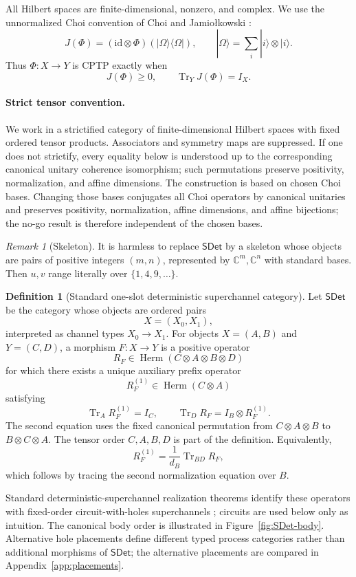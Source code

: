 \documentclass[11pt,a4paper]{article}
\theoremstyle{definition}
\newtheorem{definition}{Definition}[section]
\theoremstyle{plain}
\theoremstyle{remark}
\newtheorem{remark}[theorem]{Remark}
\DeclareMathOperator{\Tr}{Tr}
\DeclareMathOperator{\Herm}{Herm}
\newcommand{\id}{\mathrm{id}}
\newcommand{\SDet}{\mathsf{SDet}}
\begin{document}
All Hilbert spaces are finite-dimensional, nonzero, and complex. We use the
unnormalized Choi convention of Choi and Jamio\l{}kowski
\cite{choi1975,jamiolkowski1972}:
\[
J(\Phi)=(\id\otimes\Phi)(|\Omega\rangle\langle\Omega|),
\qquad |\Omega\rangle=\sum_i|i\rangle\otimes|i\rangle.
\]
Thus $\Phi:X\to Y$ is CPTP exactly when
\[
J(\Phi)\ge0,
\qquad \Tr_YJ(\Phi)=I_X.
\]

\paragraph{Strict tensor convention.}
We work in a strictified category of finite-dimensional Hilbert spaces
with fixed ordered tensor products. Associators and symmetry maps are
suppressed. If one does not strictify, every equality below is understood
up to the corresponding canonical unitary coherence isomorphism; such
permutations preserve positivity, normalization, and affine dimensions.
The construction is based on chosen Choi bases. Changing those bases
conjugates all Choi operators by canonical unitaries and preserves
positivity, normalization, affine dimensions, and affine bijections; the
no-go result is therefore independent of the chosen bases.

\begin{remark}[Skeleton]
It is harmless to replace $\SDet$ by a skeleton whose objects are pairs of
positive integers $(m,n)$, represented by $\mathbb C^m,\mathbb C^n$ with
standard bases. Then $u,v$ range literally over $\{1,4,9,\ldots\}$.
\end{remark}

\begin{definition}[Standard one-slot deterministic superchannel category]
\label{def:SDet}
Let $\SDet$ be the category whose objects are ordered pairs
\[
X=(X_0,X_1),
\]
interpreted as channel types $X_0\to X_1$. For objects
$X=(A,B)$ and $Y=(C,D)$, a morphism $F:X\to Y$ is a positive operator
\[
R_F\in\Herm(C\otimes A\otimes B\otimes D)
\]
for which there exists a unique auxiliary prefix operator
\[
R_F^{(1)}\in\Herm(C\otimes A)
\]
satisfying
\[
\Tr_A R_F^{(1)}=I_C,
\qquad
\Tr_D R_F=I_B\otimes R_F^{(1)}.
\]
The second equation uses the fixed canonical permutation from
$C\otimes A\otimes B$ to $B\otimes C\otimes A$. The tensor order
$C,A,B,D$ is part of the definition. Equivalently,
\[
R_F^{(1)}=\frac{1}{d_B}\Tr_{BD}R_F,
\]
which follows by tracing the second normalization equation over $B$.
\end{definition}

Standard deterministic-superchannel
realization theorems identify these operators with fixed-order
circuit-with-holes superchannels \cite{chiribella2009,chiribella2013};
circuits are used below only as intuition. The canonical body order is
illustrated in Figure~\ref{fig:SDet-body}. Alternative hole placements
define different typed process categories rather than additional morphisms of
$\SDet$; the alternative placements are compared in
Appendix~\ref{app:placements}.
\end{document}

